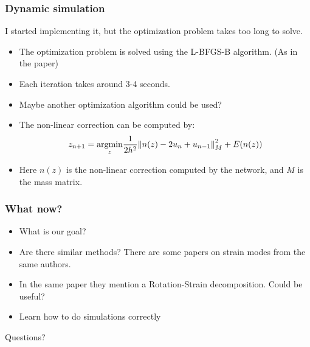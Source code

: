 \documentclass{beamer}
\DeclareMathOperator{\argmin}{argmin}
\begin{document}
\begin{frame}
    \frametitle{Dynamic simulation}
    I started implementing it, but the optimization problem takes too long to solve.
    \begin{itemize}
        \item The optimization problem is solved using the L-BFGS-B algorithm. (As in the paper)
        \item Each iteration takes around 3-4 seconds.
        \item Maybe another optimization algorithm could be used?
    \end{itemize}
    \begin{itemize}
        \item The non-linear correction can be computed by:
        \[
        z_{n+1} = \underset{z}{\argmin}  \frac{1}{2h^2} \norm{n(z) - 2u_n + u_{n-1}}^2_M + E(n(z))
        \]
        \item Here \(n(z)\) is the non-linear correction computed by the network, and \(M\) is the mass matrix.
    \end{itemize}
\end{frame}

\begin{frame}
    \frametitle{What now?}
    \begin{itemize}
        \item What is our goal?
        \item Are there similar methods? There are some papers on strain modes from the same authors.
        \item In the same paper they mention a Rotation-Strain decomposition. Could be useful?
        \item Learn how to do simulations correctly
    
    \end{itemize}
\end{frame}

\begin{frame}
    \begin{center}
        \color{blue} \Huge{Questions?}
    \end{center}

\end{frame}
\end{document}
